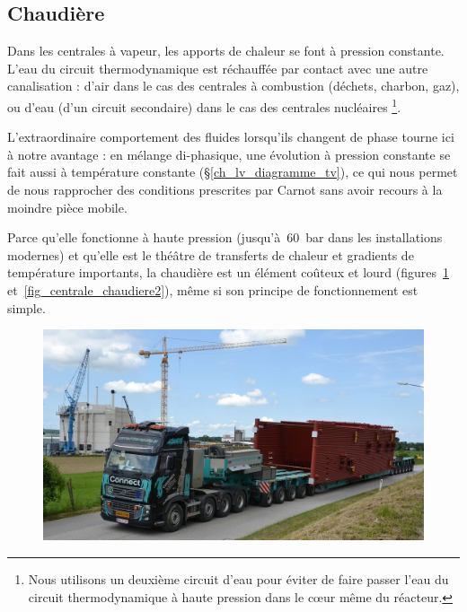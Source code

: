 	\subsection{Chaudière}
	\label{ch_chaudière}

		Dans les centrales à vapeur, les apports de chaleur se font à pression constante. L’eau du circuit thermodynamique est réchauffée par contact avec une autre canalisation : d’air dans le cas des centrales à combustion (déchets, charbon, gaz), ou d’eau (d’un circuit secondaire) dans le cas des centrales nucléaires%
		\footnote{Nous utilisons un deuxième circuit d’eau pour éviter de faire passer l’eau du circuit thermodynamique à haute pression dans le cœur même du réacteur.}\nolinebreak.

		L’extraordinaire comportement des fluides lorsqu’ils changent de phase tourne ici à notre avantage : en mélange di-phasique, une évolution à pression constante se fait aussi à température constante (\S\ref{ch_lv_diagramme_tv}),	ce qui nous permet de nous rapprocher des conditions prescrites par Carnot sans avoir recours à la moindre pièce mobile.
		
		Parce qu’elle fonctionne à haute pression (jusqu’à~\SI{60}{\bar} dans les installations modernes) et qu’elle est le théâtre de transferts de chaleur et gradients de température importants, la chaudière est un élément coûteux et lourd (figures~\ref{fig_centrale_chaudiere1} et~\ref{fig_centrale_chaudiere2}), même si son principe de fonctionnement est simple.

		\begin{figure}
			\begin{center}
				\includegraphics[width=\textwidth]{images/centrale_chaudiere_photo.jpg}
			\end{center}
			\label{fig_centrale_chaudiere1}
		\end{figure}

